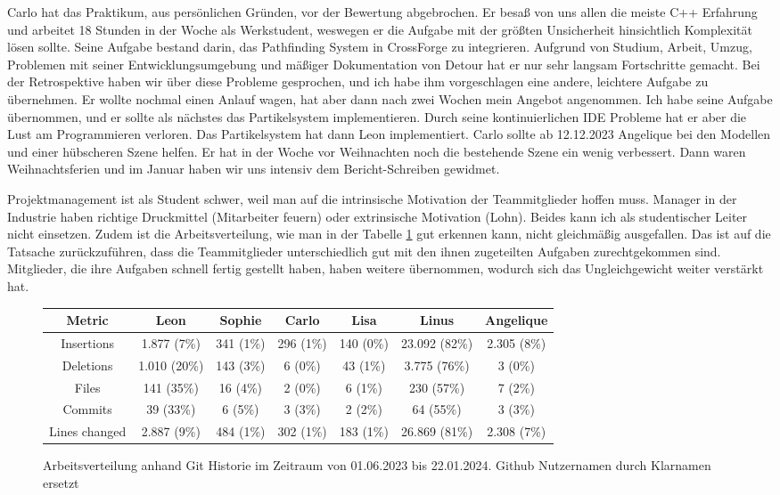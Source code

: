 Carlo hat das Praktikum, aus persönlichen Gründen, vor der Bewertung abgebrochen. Er besaß von uns allen die meiste C++ Erfahrung und arbeitet 18 Stunden in der Woche als Werkstudent, weswegen er die Aufgabe mit der größten Unsicherheit hinsichtlich Komplexität lösen sollte. Seine Aufgabe bestand darin, das Pathfinding System in CrossForge zu integrieren. Aufgrund von Studium, Arbeit, Umzug, Problemen mit seiner Entwicklungsumgebung und mäßiger Dokumentation von Detour hat er nur sehr langsam Fortschritte gemacht.  Bei der Retrospektive haben wir über diese Probleme gesprochen, und ich habe ihm vorgeschlagen eine andere, leichtere Aufgabe zu übernehmen. Er wollte nochmal einen Anlauf wagen, hat aber dann nach zwei Wochen mein Angebot angenommen. Ich habe seine Aufgabe übernommen, und er sollte als nächstes das Partikelsystem implementieren. Durch seine kontinuierlichen IDE Probleme hat er aber die Lust am Programmieren verloren. Das Partikelsystem hat dann Leon implementiert. Carlo sollte ab 12.12.2023 Angelique bei den Modellen und einer hübscheren Szene helfen. Er hat in der Woche vor Weihnachten noch die bestehende Szene ein wenig verbessert. Dann waren Weihnachtsferien und im Januar haben wir uns intensiv dem Bericht-Schreiben gewidmet.

Projektmanagement ist als Student schwer, weil man auf die intrinsische Motivation der Teammitglieder hoffen muss. Manager in der Industrie haben richtige Druckmittel (Mitarbeiter feuern) oder extrinsische Motivation (Lohn). Beides kann ich als studentischer Leiter nicht einsetzen. 
Zudem ist die Arbeitsverteilung, wie man in der Tabelle \ref{arbeitsaufteilung} gut erkennen kann, nicht gleichmäßig ausgefallen. Das ist auf die Tatsache zurückzuführen, dass die Teammitglieder unterschiedlich gut mit den ihnen zugeteilten Aufgaben zurechtgekommen sind. Mitglieder, die ihre Aufgaben schnell fertig gestellt haben, haben weitere übernommen, wodurch sich das Ungleichgewicht weiter verstärkt hat.

\begin{figure}[h!]
\begin{tabular}{|c|c|c|c|c|c|c|}
\hline
Metric        & Leon         & Sophie    & Carlo     & Lisa      & Linus         & Angelique \\
\hline
Insertions    & 1.877 (7\%)  & 341 (1\%) & 296 (1\%) & 140 (0\%) & 23.092 (82\%) & 2.305 (8\%) \\
\hline
Deletions     & 1.010 (20\%) & 143 (3\%) & 6 (0\%)   & 43 (1\%)  & 3.775 (76\%)  & 3 (0\%) \\
\hline
Files         & 141 (35\%)   & 16 (4\%)  & 2 (0\%)   & 6 (1\%)   & 230 (57\%)    & 7 (2\%) \\
\hline
Commits       & 39 (33\%)    & 6 (5\%)   & 3 (3\%)   & 2 (2\%)   & 64 (55\%)     & 3 (3\%) \\
\hline
Lines changed & 2.887 (9\%)  & 484 (1\%) & 302 (1\%) & 183 (1\%) & 26.869 (81\%) & 2.308 (7\%) \\
\hline
\end{tabular}
\caption{Arbeitsverteilung anhand Git Historie im Zeitraum von 01.06.2023 bis 22.01.2024. Github Nutzernamen durch Klarnamen ersetzt}
\label{arbeitsaufteilung}
\end{figure}